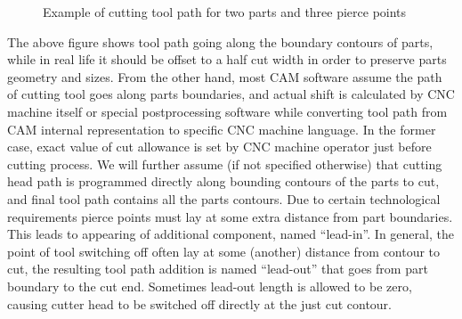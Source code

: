 \documentclass{../download/tPRS2e}
\begin{document}
\begin{figure}[h]
    \begin{center}
    \end{center}    
    \caption{Example of cutting tool path for two parts and three pierce points} \label{toolpath}
\end{figure}

The above figure shows tool path going
along the boundary contours of parts,
while in real life it should be offset to
a half cut width in order to preserve parts geometry and sizes.
From the other hand,
most CAM software assume
the path of cutting tool goes
along parts boundaries,
and actual shift is calculated
by CNC machine itself
or special postprocessing software
while converting tool path
from CAM internal representation
to specific CNC machine language.
In the former case,
exact value of cut allowance
is set by CNC machine operator
just before cutting process.
We will further assume
(if not specified otherwise)
that cutting head path is programmed
directly along bounding contours of the parts to cut,
and final tool path contains all the parts contours.
Due to certain technological requirements
pierce points must lay at some extra distance
from part boundaries.
This leads to appearing of additional component,
named ``lead-in''.
In general,
the point of tool switching off
often lay at some
(another) distance from contour to cut,
the resulting tool path addition
is named ``lead-out''
that goes from part boundary to the cut end.
Sometimes lead-out length is allowed to be zero,
causing cutter head to be switched off
directly at the just cut contour.
\end{document}
